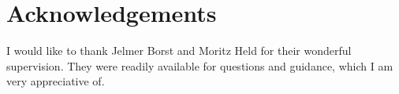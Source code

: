 
\section{Acknowledgements}\label{sec:acknowledgements}
I would like to thank Jelmer Borst and Moritz Held for their wonderful supervision.
They were readily available for questions and guidance, which I am very appreciative of.
